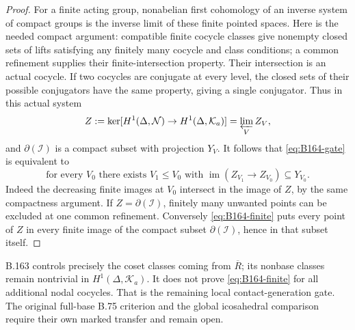 \begin{proof}
For a finite acting group, nonabelian first cohomology of an inverse
system of compact groups is the inverse limit of these finite pointed
spaces. Here is the needed compact argument: compatible finite cocycle
classes give nonempty closed sets of lifts satisfying any finitely
many cocycle and class conditions; a common refinement supplies their
finite-intersection property. Their intersection is an actual cocycle.
If two cocycles are conjugate at every level, the closed sets of their
possible conjugators have the same property, giving a single conjugator.
Thus in this actual system
\[
 Z:=\ker[H^1(\Delta,\mathcal N)\to H^1(\Delta,\mathcal K_a)]
       =\varprojlim_V Z_V,
\]
and $\partial(\mathcal I)$ is a compact subset with projection $Y_V$.
It follows that \eqref{eq:B164-gate} is equivalent to
\begin{equation}\label{eq:B164-finite}
 \text{for every }V_0\text{ there exists }V_1\le V_0
 \text{ with }
 \operatorname{im}(Z_{V_1}\to Z_{V_0})\subseteq Y_{V_0}.
\end{equation}
Indeed the decreasing finite images at $V_0$ intersect in the image
of $Z$, by the same compactness argument. If $Z=\partial(\mathcal I)$,
finitely many unwanted points can be excluded at one common refinement.
Conversely \eqref{eq:B164-finite} puts every point of $Z$ in every
finite image of the compact subset $\partial(\mathcal I)$, hence in
that subset itself.
\end{proof}
B.163 controls precisely the coset classes coming from $\overline R$;
its nonbase classes remain nontrivial in $H^1(\Delta,\mathcal K_a)$.
It does not prove \eqref{eq:B164-finite} for all additional nodal
cocycles. That is the remaining local contact-generation gate.
The original full-base B.75 criterion and the global icosahedral
comparison require their own marked transfer and remain open.
